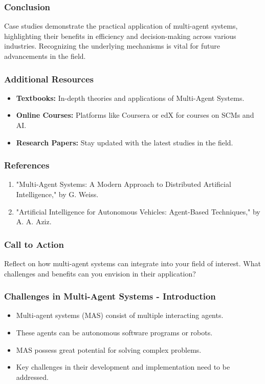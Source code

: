 \documentclass[aspectratio=169]{beamer}
\begin{document}
\begin{frame}[fragile]
    \frametitle{Conclusion}
    Case studies demonstrate the practical application of multi-agent systems, highlighting their benefits in efficiency and decision-making across various industries. Recognizing the underlying mechanisms is vital for future advancements in the field.
\end{frame}

\begin{frame}[fragile]
    \frametitle{Additional Resources}
    \begin{itemize}
        \item \textbf{Textbooks:} In-depth theories and applications of Multi-Agent Systems.
        \item \textbf{Online Courses:} Platforms like Coursera or edX for courses on SCMs and AI.
        \item \textbf{Research Papers:} Stay updated with the latest studies in the field.
    \end{itemize}
\end{frame}

\begin{frame}[fragile]
    \frametitle{References}
    \begin{enumerate}
        \item "Multi-Agent Systems: A Modern Approach to Distributed Artificial Intelligence," by G. Weiss.
        \item "Artificial Intelligence for Autonomous Vehicles: Agent-Based Techniques," by A. A. Aziz.
    \end{enumerate}
\end{frame}

\begin{frame}[fragile]
    \frametitle{Call to Action}
    Reflect on how multi-agent systems can integrate into your field of interest. What challenges and benefits can you envision in their application?
\end{frame}

\begin{frame}[fragile]
    \frametitle{Challenges in Multi-Agent Systems - Introduction}
    \begin{itemize}
        \item Multi-agent systems (MAS) consist of multiple interacting agents.
        \item These agents can be autonomous software programs or robots.
        \item MAS possess great potential for solving complex problems.
        \item Key challenges in their development and implementation need to be addressed.
    \end{itemize}
\end{frame}
\end{document}

